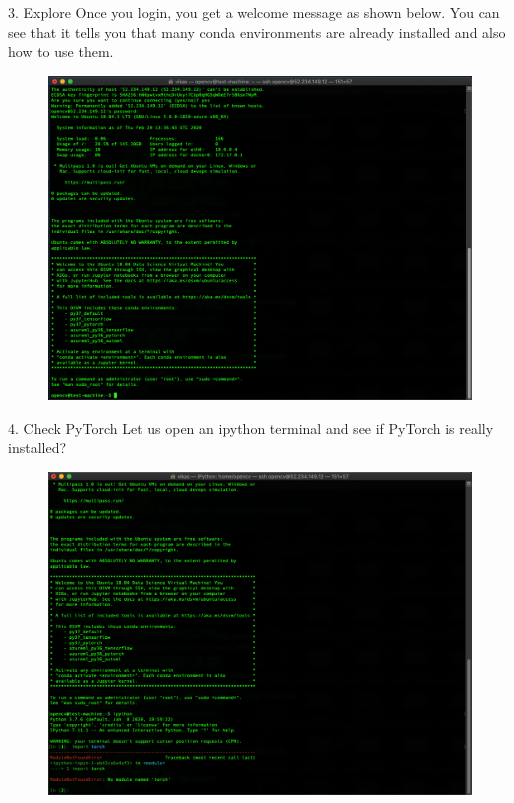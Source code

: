 3. Explore
Once you login, you get a welcome message as shown below. You can see that it tells you that many conda environments are already installed and also how to use them.

\begin{figure}[H]
\begin{center} 
\includegraphics[scale=0.30]{figures/ssh7}
\end{center}
\end{figure}

4. Check PyTorch
Let us open an ipython terminal and see if PyTorch is really installed?

\begin{figure}[H]
\begin{center} 
\includegraphics[scale=0.30]{figures/ssh8}
\end{center}
\end{figure}

